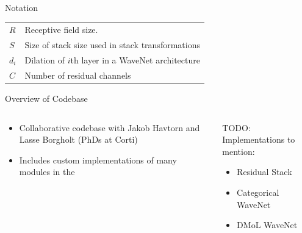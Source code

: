 \documentclass[
  ignorenonframetext,
  aspectratio=169,
]{beamer}
\providecommand{\tightlist}{%
  \setlength{\itemsep}{0pt}\setlength{\parskip}{0pt}}
\begin{document}
\begin{frame}{Notation}
\begin{longtable}[]{@{}ll@{}}
\begin{minipage}[t]{0.32\columnwidth}
\(R\)\strut
\end{minipage} & \begin{minipage}[t]{0.62\columnwidth}\raggedright
Receptive field size.\strut
\end{minipage}\tabularnewline
\begin{minipage}[t]{0.32\columnwidth}\raggedright
\(S\)\strut
\end{minipage} & \begin{minipage}[t]{0.62\columnwidth}\raggedright
Size of stack size used in stack transformations\strut
\end{minipage}\tabularnewline
\begin{minipage}[t]{0.32\columnwidth}\raggedright
\(d_i\)\strut
\end{minipage} & \begin{minipage}[t]{0.62\columnwidth}\raggedright
Dilation of \(i\)th layer in a WaveNet architecture\strut
\end{minipage}\tabularnewline
\begin{minipage}[t]{0.32\columnwidth}\raggedright
\(C\)\strut
\end{minipage} & \begin{minipage}[t]{0.62\columnwidth}\raggedright
Number of residual channels\strut
\end{minipage}\tabularnewline
\bottomrule
\end{longtable}
\end{frame}

\begin{frame}{Overview of Codebase}
\protect\hypertarget{overview-of-codebase}{}
\begin{columns}[T]
\begin{column}{0.48\textwidth}
\begin{itemize}
\tightlist
\item
  Collaborative codebase with Jakob Havtorn and Lasse Borgholt (PhDs at
  Corti)
\item
  Includes custom implementations of many modules in the
\end{itemize}
\end{column}

\begin{column}{0.48\textwidth}
TODO: Implementations to mention:

\begin{itemize}
\tightlist
\item
  Residual Stack
\item
  Categorical WaveNet
\item
  DMoL WaveNet
\end{itemize}
\end{column}
\end{columns}
\end{frame}
\end{document}
